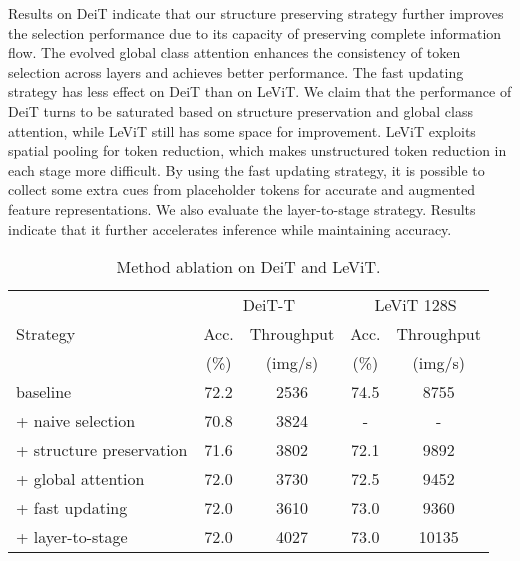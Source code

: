 \documentclass[letterpaper]{article} \usepackage{aaai22}  \usepackage{times}  \usepackage{helvet}  \usepackage{courier}  \usepackage[hyphens]{url}  \usepackage{graphicx} \urlstyle{rm} \def\UrlFont{\rm}  \usepackage{natbib}  \usepackage{caption} \DeclareCaptionStyle{ruled}{labelfont=normalfont,labelsep=colon,strut=off} \frenchspacing  \setlength{\pdfpagewidth}{8.5in}  \setlength{\pdfpageheight}{11in}  \usepackage{algorithm}
\begin{document}
Results on DeiT indicate that our structure preserving strategy further improves the selection performance due to its capacity of preserving complete information flow. The evolved global class attention enhances the consistency of token selection across layers and achieves better performance. The fast updating strategy has less effect on DeiT than on LeViT. We claim that the performance of DeiT turns to be saturated based on structure preservation and global class attention, while LeViT still has some space for improvement. LeViT exploits spatial pooling for token reduction, which makes unstructured token reduction in each stage more difficult. By using the fast updating strategy, it is possible to collect some extra cues from  placeholder tokens for accurate and augmented feature representations.
We also evaluate the layer-to-stage strategy. Results indicate that it further accelerates inference while maintaining accuracy. 
\begin{table}[t]
\centering
\caption{Method ablation on DeiT and LeViT.}
\label{tab:method_ablation_deit}
\setlength{\tabcolsep}{1mm}
\small{
\begin{tabular}{l|cc|cc}
\toprule
\multirow{3}{*}{Strategy} & \multicolumn{2}{c}{DeiT-T}           & \multicolumn{2}{|c}{LeViT 128S} \\
\cline{2-5}
 & Acc. & Throughput & Acc. & Throughput \\
 & (\%) & (img/s) & (\%) & (img/s) \\
\midrule
baseline                 & 72.2            & 2536               & 74.5            & 8755               \\
+ naive selection        & 70.8            & 3824               & -               & -                  \\
+ structure preservation & 71.6            & 3802               & 72.1            & 9892               \\
+ global attention       & 72.0            & 3730               & 72.5            & 9452               \\
+ fast updating          & 72.0            & 3610               & 73.0            & 9360               \\
+ layer-to-stage         & 72.0            & 4027               & 73.0            & 10135               \\
\bottomrule
\end{tabular}
}
\vspace{-2mm}
\end{table} 
\end{document}
